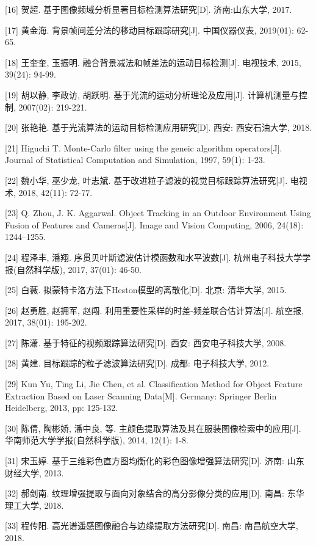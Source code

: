 \documentclass[
]{article}
\begin{document}
{[}16{]} 贺超. 基于图像频域分析显著目标检测算法研究{[}D{]}.
济南:山东大学, 2017.

{[}17{]} 黄金海. 背景帧间差分法的移动目标跟踪研究{[}J{]}. 中国仪器仪表,
2019(01): 62-65.

{[}18{]} 王奎奎, 玉振明. 融合背景减法和帧差法的运动目标检测{[}J{]}.
电视技术, 2015, 39(24): 94-99.

{[}19{]} 胡以静, 李政访, 胡跃明. 基于光流的运动分析理论及应用{[}J{]}.
计算机测量与控制, 2007(02): 219-221.

{[}20{]} 张艳艳. 基于光流算法的运动目标检测应用研究{[}D{]}. 西安:
西安石油大学, 2018.

{[}21{]} Higuchi T. Monte-Carlo filter using the geneic algorithm
operators{[}J{]}. Journal of Statistical Computation and Simulation,
1997, 59(1): 1-23.

{[}22{]} 魏小华, 巫少龙, 叶志斌.
基于改进粒子滤波的视觉目标跟踪算法研究{[}J{]}. 电视术, 2018, 42(11):
72-77.

{[}23{]} Q. Zhou, J. K. Aggarwal. Object Tracking in an Outdoor
Environment Using Fusion of Features and Cameras{[}J{]}. Image and
Vision Computing, 2006, 24(18): 1244--1255.

{[}24{]} 程泽丰, 潘翔. 序贯贝叶斯滤波估计模函数和水平波数{[}J{]}.
杭州电子科技大学学报(自然科学版), 2017, 37(01): 46-50.

{[}25{]} 白薇. 拟蒙特卡洛方法下Heston模型的离散化{[}D{]}. 北京:
清华大学, 2015.

{[}26{]} 赵勇胜, 赵拥军, 赵闯.
利用重要性采样的时差-频差联合估计算法{[}J{]}. 航空报, 2017, 38(01):
195-202.

{[}27{]} 陈潇. 基于特征的视频跟踪算法研究{[}D{]}. 西安:
西安电子科技大学, 2008.

{[}28{]} 黄建. 目标跟踪的粒子滤波算法研究{[}D{]}. 成都: 电子科技大学,
2012.

{[}29{]} Kun Yu, Ting Li, Jie Chen, et al. Classification Method for
Object Feature Extraction Based on Laser Scanning Data{[}M{]}. Germany:
Springer Berlin Heidelberg, 2013, pp: 125-132.

{[}30{]} 陈倩, 陶彬娇, 潘中良, 等.
主颜色提取算法及其在服装图像检索中的应用{[}J{]}.
华南师范大学学报(自然科学版), 2014, 12(1): 1-8.

{[}31{]} 宋玉婷. 基于三维彩色直方图均衡化的彩色图像增强算法研究{[}D{]}.
济南: 山东财经大学, 2013.

{[}32{]} 郝剑南. 纹理增强提取与面向对象结合的高分影像分类的应用{[}D{]}.
南昌: 东华理工大学, 2018.

{[}33{]} 程传阳. 高光谱遥感图像融合与边缘提取方法研究{[}D{]}. 南昌:
南昌航空大学, 2018.
\end{document}
